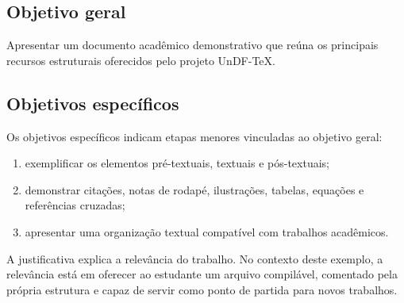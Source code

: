 \subsection{Objetivo geral}

Apresentar um documento acadêmico demonstrativo que reúna os principais recursos estruturais oferecidos pelo projeto UnDF-TeX.

\subsection{Objetivos específicos}

Os objetivos específicos indicam etapas menores vinculadas ao objetivo geral:

\begin{enumerate}
	\item exemplificar os elementos pré-textuais, textuais e pós-textuais;
	\item demonstrar citações, notas de rodapé, ilustrações, tabelas, equações e referências cruzadas;
	\item apresentar uma organização textual compatível com trabalhos acadêmicos.
\end{enumerate}


A justificativa explica a relevância do trabalho. No contexto deste exemplo, a relevância está em oferecer ao estudante um arquivo compilável, comentado pela própria estrutura e capaz de servir como ponto de partida para novos trabalhos.
